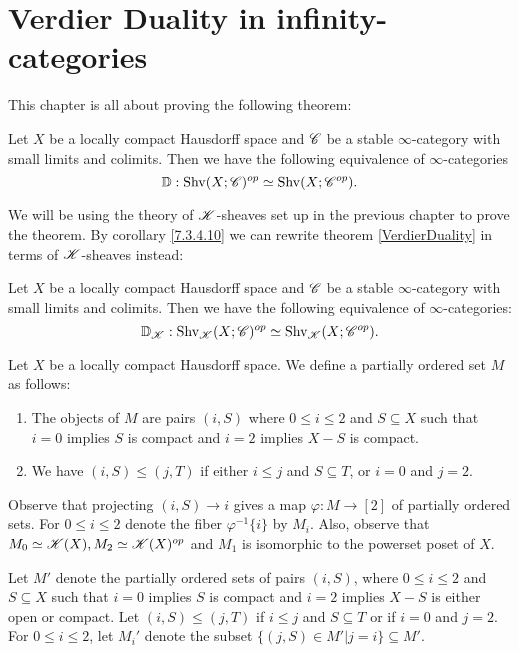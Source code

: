 \documentclass[../../thesis.tex]{subfiles}
\begin{document}
\section{Verdier Duality in infinity-categories}
This chapter is all about proving the following theorem:
\begin{theorem}[{\cite[][Theorem 5.5.5.1]{HA}}]\label{VerdierDuality}
    Let $X$ be a locally compact Hausdorff space and $\mathscr{C}$ be a stable $\infty$-category with small limits and colimits.
    Then we have the following equivalence of $\infty$-categories
    \[
        \mathbb{D} : \mathrm{Shv}(X;\mathscr{C})^{op} \simeq \mathrm{Shv}(X;\mathscr{C}^{op}).
    \]
\end{theorem}
We will be using the theory of $\mathscr{K}$-sheaves set up in the previous chapter to prove the theorem.
By corollary \ref{7.3.4.10} we can rewrite theorem \ref{VerdierDuality} in terms of $\mathscr{K}$-sheaves instead:
\begin{theorem}\label{KVerdierDuality}
    Let $X$ be a locally compact Hausdorff space and $\mathscr{C}$ be a stable $\infty$-category with small limits and colimits.
    Then we have the following equivalence of $\infty$-categories:
    \[
        \mathbb{D}_{\mathscr{K}} : \mathrm{Shv}_{\mathscr{K}}(X;\mathscr{C})^{op} \simeq \mathrm{Shv}_{\mathscr{K}}(X;\mathscr{C}^{op}).
    \]
\end{theorem}
\begin{definition}[{\cite[Notation 5.5.5.5]{HA}}]\label{5.5.5.5}
    Let $X$ be a locally compact Hausdorff space.
    We define a partially ordered set $M$ as follows:
    \begin{enumerate}
        \item The objects of $M$ are pairs $(i,S)$ where $0 \leq i \leq 2$ and $S \subseteq X$ such that $i=0$ implies $S$ is compact and $i=2$ implies $X-S$ is compact.
        \item We have $(i,S) \leq (j,T)$ if either $i\leq j$ and $S\subseteq T$, or $i=0$ and $j=2$.
    \end{enumerate}
\end{definition}
\begin{remark}[{\cite[Remark 5.5.5.6]{HA}}]
    Observe that projecting $(i,S) \to i$ gives a map $\varphi: M \to [2]$ of partially ordered sets.
    For $0 \leq i \leq 2$ denote the fiber $\varphi^{-1}\{i\}$ by $M_i$.
    Also, observe that $M_0 \simeq \mathscr{K}(X), M_2\simeq \mathscr{K}(X)^{op}$ and $M_1$ is isomorphic to the powerset poset of $X$.
\end{remark}
\begin{definition}
    Let $M'$ denote the partially ordered sets of pairs $(i,S)$, where $0 \leq i \leq 2$ and $S \subseteq X$ such that $i=0$ implies $S$ is compact and $i=2$ implies $X-S$ is either open or compact.
    Let $(i, S) \leq (j,T)$ if $i\leq j$ and $S\subseteq T$ or if $i=0$ and $j=2$.
    For $0 \leq i \leq 2$, let $M_i'$ denote the subset $\{(j,S) \in M' | j=i\} \subseteq M'$.
\end{definition}
\end{document}
